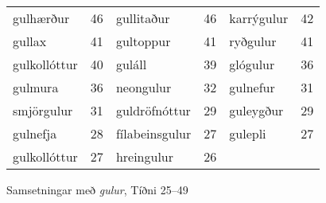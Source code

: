 \documentclass[../samsetningasafn.tex]{subfiles}
\begin{document}
\begin{wordlist}[H]
\begin{tcolorbox}

	\setlength{\extrarowheight}{3pt}
	\begin{tabular}{BlBlBl}	
		gulhærður		& 46		& 	
		gullitaður		& 46		& 
		karrýgulur		& 42		\\ 
		gullax			& 41		& 	
		gultoppur		& 41		& 
		ryðgulur			& 41		\\ 
		gulkollóttur		& 40		& 		
		guláll			& 39		& 	
		glógulur			& 36		\\ 
		gulmura			& 36		& 	
		neongulur		& 32		& 	
		gulnefur			& 31		\\ 
		smjörgulur		& 31		& 	
		guldröfnóttur		& 29		& 
		guleygður		& 29		\\ 
		gulnefja			& 28		& 
		fílabeinsgulur		& 27		& 	
		gulepli			& 27		\\ 	
		gulkollóttur		& 27		& 	
		hreingulur		& 26		& 	
						& 
	\end{tabular}

\end{tcolorbox}
	\caption{Samsetningar með \textit{gulur}, Tíðni 25--49}
	\label{listi:gult.25}
\end{wordlist}
\end{document}
